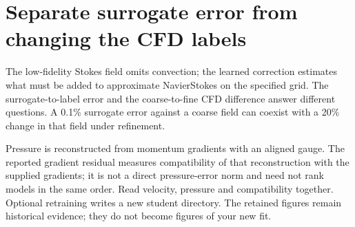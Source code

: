 \section*{Separate surrogate error from changing the CFD labels}
The low-fidelity Stokes field omits convection; the learned correction estimates
what must be added to approximate Navier\textendash{}Stokes on the specified grid. The
surrogate-to-label error and the coarse-to-fine CFD difference answer different
questions. A 0.1\% surrogate error against a coarse field can coexist with a 20\%
change in that field under refinement.

Pressure is reconstructed from momentum gradients with an aligned gauge. The
reported gradient residual measures compatibility of that reconstruction with
the supplied gradients; it is not a direct pressure-error norm and need not rank
models in the same order. Read velocity, pressure and compatibility together.
Optional retraining writes a new student directory. The retained figures remain
historical evidence; they do not become figures of your new fit.
